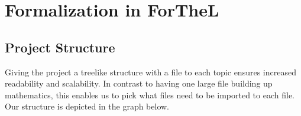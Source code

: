 \documentclass[11pt]{article}
\begin{document}
\newpage
\lstset{style=ftl}
\section{Formalization in ForTheL}
\subsection{Project Structure}
Giving the project a treelike structure with a file to each topic ensures increased readability and scalability. 
In contrast to having one large file building up mathematics, this enables us to pick what files need to be imported to each file. 
Our structure is depicted in the graph below.

\begin{figure}[h]
\begin{center}
\end{center}
\end{figure}

\newpage
\end{document}
